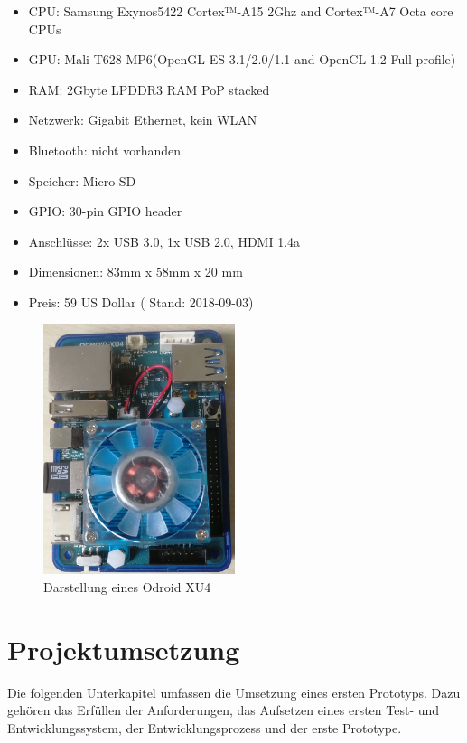 \documentclass[titlepage]{report}
\begin{document}
\begin{itemize}
    \item CPU: Samsung Exynos5422 Cortex™-A15 2Ghz and Cortex™-A7 Octa core CPUs
    \item GPU: Mali-T628 MP6(OpenGL ES 3.1/2.0/1.1 and OpenCL 1.2 Full profile)
    \item RAM: 2Gbyte LPDDR3 RAM PoP stacked
    \item Netzwerk: Gigabit Ethernet, kein WLAN
    \item Bluetooth: nicht vorhanden
    \item Speicher: Micro-SD
    \item GPIO: 30-pin GPIO header\cite{ODROID_GPIO}
    \item Anschlüsse: 2x USB 3.0, 1x USB 2.0, HDMI 1.4a
    \item Dimensionen: 83mm x 58mm x 20 mm
    \item Preis: 59 US Dollar\cite{ODROID_PRICE} ( Stand: 2018-09-03)
\end{itemize}
\begin{figure}[H]
    \centering
    \includegraphics[width=0.5\textwidth]{figures/odroid.jpg}
    \caption{Darstellung eines Odroid XU4}\label{fig:odroid}
\end{figure}
\chapter*{Projektumsetzung}
Die folgenden Unterkapitel umfassen die Umsetzung eines ersten
Prototyps. Dazu gehören das Erfüllen der Anforderungen, das Aufsetzen
eines ersten Test- und Entwicklungssystem, der Entwicklungsprozess
und der erste Prototype.
\end{document}
